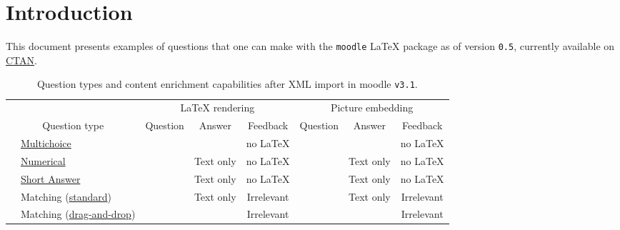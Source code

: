 \documentclass[twocolumn]{article}
\begin{document}
\section*{Introduction}

This document presents examples of questions that one can make with the 
\texttt{moodle} \LaTeX{} package as of version \texttt{0.5}, currently 
available on \href{https://ctan.org/pkg/moodle}{CTAN}.

\begin{table*}[tbp]
\centering
\begin{threeparttable}[b]
\caption{Question types and content enrichment capabilities after XML import in 
moodle \texttt{v3.1}.}
\label{tab:2}
\begin{tabular}{rl|ccc|ccc}
\multicolumn{2}{c|}{}& \multicolumn{3}{c|}{\LaTeX{} rendering} & 
\multicolumn{3}{c}{Picture embedding}\\
\multicolumn{2}{c|}{Question type}& Question & Answer & Feedback & Question & 
Answer & Feedback\\\hline\hline

&\href{https://docs.moodle.org/31/en/Multiple_Choice_question_type}{Multichoice}\tnote{1}
 & \cellcolor{green}  & \cellcolor{green} & \cellcolor{red}no \LaTeX\tnote{2}
 & \cellcolor{green} & \cellcolor{green} & \cellcolor{red}no 
 \LaTeX\tnote{2}\\\hline

& \href{https://docs.moodle.org/31/en/Numerical_question_type}{Numerical} & 
\cellcolor{green} & \cellcolor{black!25}Text only\tnote{5} & \cellcolor{red}no 
\LaTeX\tnote{2} & \cellcolor{green} & \cellcolor{black!25}Text only\tnote{5} & 
\cellcolor{red}no \LaTeX\tnote{2}\\\hline

& \href{https://docs.moodle.org/31/en/Short-Answer_question_type}{Short Answer} 
& \cellcolor{green} & \cellcolor{black!25}Text only\tnote{5} & 
\cellcolor{red}no \LaTeX\tnote{2} & \cellcolor{green} & 
\cellcolor{black!25}Text only\tnote{5} & \cellcolor{red}no 
\LaTeX\tnote{2}\\\hline

&Matching 
(\href{https://docs.moodle.org/31/en/Matching_question_type}{standard}) & 
\cellcolor{green} & \cellcolor{black!25}Text only\tnote{3} & 
\cellcolor{black!25}Irrelevant\tnote{4} & \cellcolor{green} & 
\cellcolor{black!25}Text only\tnote{3} & 
\cellcolor{black!25}Irrelevant\tnote{4} \\\hline

&Matching 
(\href{https://docs.moodle.org/31/en/Drag_and_drop_matching_question_type}{drag-and-drop})
 & \cellcolor{green} & \cellcolor{green} &\cellcolor{black!25} 
 Irrelevant\tnote{4} & \cellcolor{green} & \cellcolor{green} &  
 \cellcolor{black!25} Irrelevant\tnote{4} \\\hline


\end{tabular}
\end{threeparttable}
\end{table*}
\end{document}
